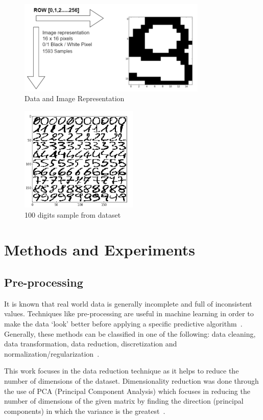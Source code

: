 \documentclass[letterpaper,10pt]{article}
\theoremstyle{mytheor}
\begin{document}
\begin{figure}[H]
\includegraphics[width=0.8\textwidth]{dataset}
\centering
\caption{Data and Image Representation}
\label{fig:1}
\end{figure}
\begin{figure}[H]
\includegraphics[width=0.5\textwidth]{dataset100}
\centering
\caption{100 digits sample from dataset}
\label{fig:1.1}
\end{figure}
\section{Methods and Experiments}

\subsection{Pre-processing}

It is known that real world data is generally incomplete and full of inconsistent values. Techniques like pre-processing are useful in machine learning in order to make the data ‘look’ better before applying a specific predictive algorithm~\cite{bishop2007pattern}. Generally, these methods can be classified in one of the following: data cleaning, data transformation, data reduction, discretization and normalization/regularization~\cite{rajaraman2012mining}.

This work focuses in the data reduction technique as it helps to reduce the number of dimensions of the dataset. Dimensionality reduction was done through the use of PCA (Principal Component Analysis) which focuses in reducing the number of dimensions of the given matrix by finding the direction (principal components) in which the variance is the greatest~\cite{bishop2007pattern}.
\end{document}
